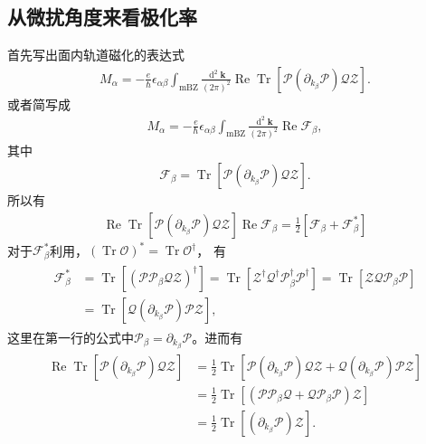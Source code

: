 \documentclass[10pt, oneside]{article}
\begin{document}
\subsection{从微扰角度来看极化率}
首先写出面内轨道磁化的表达式
\begin{align}
	M_{\alpha} = - \frac{e }{\hbar} \epsilon_{\alpha \beta} \int_{\mathrm{mBZ}} \frac{\operatorname{d}^{2} \bm{k}}{\left(2 \pi\right)^2} \operatorname{Re} \operatorname{Tr} \left[\mathcal{P} \left(\partial_{k_{\beta}} \mathcal{P}\right) \mathcal{Q} \mathcal{Z}\right].
\end{align}
或者简写成
\begin{align}
	M_{\alpha} = -\frac{ e }{\hbar} \epsilon_{\alpha \beta} \int_{\mathrm{mBZ}} \frac{ \operatorname{d}^{2} \bm{k} }{ \left( 2 \pi\right)^{2}} \operatorname{Re} \mathcal{F}_{\beta},		
\end{align}
其中
\begin{align}
	\mathcal{F}_{\beta} = \operatorname{Tr} \left[\mathcal{P} \left(\partial_{k_{\beta}} \mathcal{P}\right)\mathcal{Q} \mathcal{Z}\right].
\end{align}
所以有
\begin{align}
	\operatorname{Re} \operatorname{Tr} \left[\mathcal{P} \left( \partial_{k_{\beta}} \mathcal{P}\right)\mathcal{Q} \mathcal{Z}\right] \operatorname{Re} \mathcal{F}_{\beta} = \frac{1}{2} \left[\mathcal{F}_{\beta} + \mathcal{F}^{*}_{\beta} \right] 
\end{align}
对于\(\mathcal{F}^{*}_{\beta}\)利用，\(\left(\operatorname{Tr} \mathcal{O}\right)^{*} = \operatorname{Tr} \mathcal{O}^{\dagger}\)， 有
\begin{align}
	\begin{split}
		\mathcal{F}^{*}_{\beta} & = \operatorname{Tr} \left[\left(\mathcal{P} \mathcal{P}_{\beta} \mathcal{Q} \mathcal{Z}\right)^{\dagger}\right] = \operatorname{Tr} \left[\mathcal{Z}^{\dagger} \mathcal{Q}^{\dagger} \mathcal{P}_{\beta}^{\dagger} \mathcal{P}^{\dagger}\right] = \operatorname{Tr} \left[\mathcal{Z} \mathcal{Q} \mathcal{P}_{\beta} \mathcal{P}\right] \\
		& = \operatorname{Tr} \left[\mathcal{Q} \left(\partial_{k_{\beta}} \mathcal{P}\right) \mathcal{P}  \mathcal{Z}\right],
	\end{split}
\end{align}
这里在第一行的公式中\(\mathcal{P}_{\beta} = \partial_{k_{\beta}} \mathcal{P}\)。进而有
\begin{align}
	\begin{split}
		\operatorname{Re} \operatorname{Tr} \left[\mathcal{P} \left(\partial_{k_{\beta}} \mathcal{P} \right) \mathcal{Q} \mathcal{Z}\right] &= \frac{1}{2} \operatorname{Tr} \left[\mathcal{P} \left(\partial_{k_{\beta}} \mathcal{P} \right) \mathcal{Q} \mathcal{Z} + \mathcal{Q} \left(\partial_{k_{\beta}} \mathcal{P}\right) \mathcal{P} \mathcal{Z}\right] \\
		& = \frac{1}{2} \operatorname{Tr} \left[\left(\mathcal{P} \mathcal{P}_{\beta} \mathcal{Q} + \mathcal{Q} \mathcal{P}_{\beta} \mathcal{P}\right) \mathcal{Z}\right] \\
		& = \frac{1}{2}\operatorname{Tr} \left[\left(\partial_{k_{\beta}} \mathcal{P}\right) \mathcal{Z} \right] .
	\end{split}
\end{align}
\end{document}
